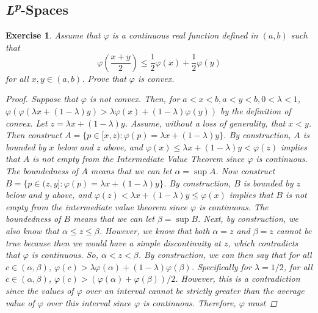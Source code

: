 \documentclass[10pt,letterpaper]{amsart}
\newtheorem{exercise}{Exercise}[section]
\theoremstyle{definition}
\theoremstyle{remark}
\numberwithin{equation}{exercise}
\begin{document}
\begin{multicols}{2}
  \section{\textnormal{\emph{L}\textsuperscript{\emph{p}}}-Spaces}
  \setcounter{exercise}{2}
  \begin{exercise}
    Assume that $\varphi$ is a continuous real function defined in $(a,b)$ such that
    \begin{equation*}
      \varphi\!\left(\frac{x+y}{2}\right) \le \frac{1}{2} \varphi(x) +
      \frac{1}{2} \varphi(y)
    \end{equation*}
    for all $x,y \in (a,b)$. Prove that $\varphi$ is convex.
    \begin{proof}
      Suppose that $\varphi$ is not convex. Then, for $a < x < b, a < y < b, 0 <
      \lambda < 1$, $\varphi(\varphi(\lambda x + (1-\lambda)y) > \lambda
      \varphi(x) + (1-\lambda)\varphi(y))$ by the definition of convex. Let $z =
      \lambda x + (1-\lambda)y$. Assume, without a loss of generality, that $x <
      y$. Then construct $A=\{p\in[x,z):\varphi(p) = \lambda x + (1-\lambda)y\}$. By
      construction, $A$ is bounded by $x$ below and $z$ above, and $\varphi(x)
      \le \lambda x + (1-\lambda)y < \varphi(z)$ implies that $A$ is not empty
      from the Intermediate Value Theorem since $\varphi$ is continuous. The
      boundedness of $A$ means that we can let $\alpha = \sup A$. Now construct
      $B=\{p\in(z,y]:\varphi(p) = \lambda x + (1-\lambda)y\}$. By construction,
      $B$ is bounded by $z$ below and $y$ above, and $\varphi(z) < \lambda x +
      (1-\lambda)y \le \varphi(x)$ implies that $B$ is not empty from the
      intermediate value theorem since $\varphi$ is continuous. The boundedness
      of $B$ means that we can let $\beta = \sup B$. Next, by construction, we
      also know that $\alpha \le z \le \beta$. However, we know that both
      $\alpha = z$ and $\beta = z$ cannot be true because then we would have a
      simple discontinuity at $z$, which contradicts that $\varphi$ is
      continuous. So, $\alpha < z < \beta$. By construction, we can then say
      that for all $c \in (\alpha,\beta)$, $\varphi(c) > \lambda \varphi(\alpha)
      + (1-\lambda)\varphi(\beta)$. Specifically for $\lambda = 1/2$, for all $c
      \in (\alpha,\beta)$, $\varphi(c) > (\varphi(\alpha) + \varphi(\beta))/2$.
      However, this is a contradiction since the values of $\varphi$ over an
      interval cannot be strictly greater than the average value of $\varphi$
      over this interval since $\varphi$ is continuous. Therefore, $\varphi$ must

\end{proof}
\end{exercise}
\end{multicols}
\end{document}
